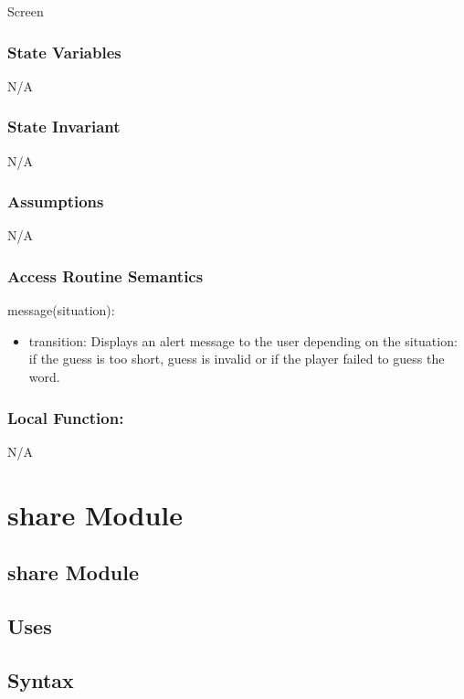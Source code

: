 \documentclass[12pt]{article}
\begin{document}
Screen

\subsubsection* {State Variables}
N/A

\subsubsection* {State Invariant}

N/A

\subsubsection* {Assumptions}

N/A

\subsubsection* {Access Routine Semantics}

\noindent message(situation):
\begin{itemize}
  \item transition: Displays an alert message to the user depending on the situation: if the guess is too short, guess is invalid or if the player failed to guess the word.
\end{itemize}

\subsubsection*{Local Function:}

N/A

\newpage

\section {share Module}

\subsection* {share Module}

\subsection* {Uses}

\subsection* {Syntax}
\end{document}
